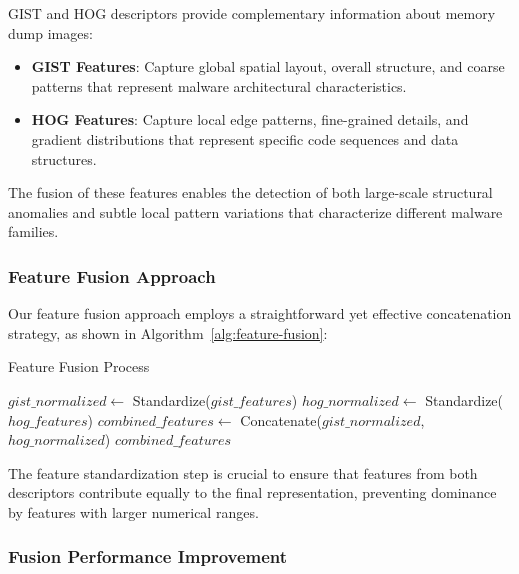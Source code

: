 GIST and HOG descriptors provide complementary information about memory dump images:

\begin{itemize}
    \item \textbf{GIST Features}: Capture global spatial layout, overall structure, and coarse patterns that represent malware architectural characteristics.
    
    \item \textbf{HOG Features}: Capture local edge patterns, fine-grained details, and gradient distributions that represent specific code sequences and data structures.
\end{itemize}

The fusion of these features enables the detection of both large-scale structural anomalies and subtle local pattern variations that characterize different malware families.

\subsubsection{Feature Fusion Approach}

Our feature fusion approach employs a straightforward yet effective concatenation strategy, as shown in Algorithm~\ref{alg:feature-fusion}:

\begin{algorithm}[!htbp]
\caption{Feature Fusion Process}
\label{alg:feature-fusion}
\begin{algorithmic}[1]
    \State $gist\_normalized \leftarrow$ Standardize($gist\_features$) 
    \State $hog\_normalized \leftarrow$ Standardize($hog\_features$) 
    \State $combined\_features \leftarrow$ Concatenate($gist\_normalized$, $hog\_normalized$)
    \Return $combined\_features$ 
\EndProcedure
\end{algorithmic}
\end{algorithm}

The feature standardization step is crucial to ensure that features from both descriptors contribute equally to the final representation, preventing dominance by features with larger numerical ranges. 

\subsubsection{Fusion Performance Improvement}

